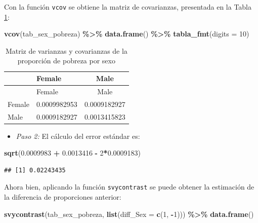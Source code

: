 \documentclass[
  spanish,
  12pt,
]{book}
\newenvironment{Shaded}{\begin{snugshade}}{\end{snugshade}}
\newcommand{\AttributeTok}[1]{\textcolor[rgb]{0.13,0.29,0.53}{#1}}
\newcommand{\DecValTok}[1]{\textcolor[rgb]{0.00,0.00,0.81}{#1}}
\newcommand{\FloatTok}[1]{\textcolor[rgb]{0.00,0.00,0.81}{#1}}
\newcommand{\FunctionTok}[1]{\textcolor[rgb]{0.13,0.29,0.53}{\textbf{#1}}}
\newcommand{\NormalTok}[1]{#1}
\newcommand{\SpecialCharTok}[1]{\textcolor[rgb]{0.81,0.36,0.00}{\textbf{#1}}}
\providecommand{\tightlist}{%
  \setlength{\itemsep}{0pt}\setlength{\parskip}{0pt}}
\begin{document}
Con la función \texttt{vcov} se obtiene la matriz de covarianzas, presentada en la Tabla \ref{tab:tab-vcov-sex-pobreza}:

\begin{Shaded}
\begin{Highlighting}[]
\FunctionTok{vcov}\NormalTok{(tab\_sex\_pobreza) }\SpecialCharTok{\%\textgreater{}\%}
  \FunctionTok{data.frame}\NormalTok{() }\SpecialCharTok{\%\textgreater{}\%}
  \FunctionTok{tabla\_fmt}\NormalTok{(}\AttributeTok{digits =} \DecValTok{10}\NormalTok{)}
\end{Highlighting}
\end{Shaded}

\begin{longtable}[]{@{}llc@{}}
\caption{\label{tab:tab-vcov-sex-pobreza}Matriz de varianzas y covarianzas de la proporción de pobreza por sexo}\tabularnewline
\toprule\noalign{}
& Female & Male \\
\midrule\noalign{}
\endfirsthead
\toprule\noalign{}
& Female & Male \\
\midrule\noalign{}
\endhead
\bottomrule\noalign{}
\endlastfoot
Female & 0.0009982953 & 0.0009182927 \\
Male & 0.0009182927 & 0.0013415823 \\
\end{longtable}

\begin{itemize}
\tightlist
\item
  \emph{Paso 2:} El cálculo del error estándar es:
\end{itemize}

\begin{Shaded}
\begin{Highlighting}[]
\FunctionTok{sqrt}\NormalTok{(}\FloatTok{0.0009983} \SpecialCharTok{+} \FloatTok{0.0013416} \SpecialCharTok{{-}} \DecValTok{2}\SpecialCharTok{*}\FloatTok{0.0009183}\NormalTok{)}
\end{Highlighting}
\end{Shaded}

\begin{verbatim}
## [1] 0.02243435
\end{verbatim}

Ahora bien, aplicando la función \texttt{svycontrast} se puede obtener la estimación de la diferencia de proporciones anterior:

\begin{Shaded}
\begin{Highlighting}[]
\FunctionTok{svycontrast}\NormalTok{(tab\_sex\_pobreza,}
            \FunctionTok{list}\NormalTok{(}\AttributeTok{diff\_Sex =} \FunctionTok{c}\NormalTok{(}\DecValTok{1}\NormalTok{, }\SpecialCharTok{{-}}\DecValTok{1}\NormalTok{))) }\SpecialCharTok{\%\textgreater{}\%}
  \FunctionTok{data.frame}\NormalTok{()}
\end{Highlighting}
\end{Shaded}
\end{document}

